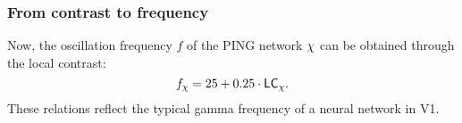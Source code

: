 \subsubsection{From contrast to frequency}

Now, the oscillation frequency $f$ of the PING network $\chi$ can be obtained through the local contrast:
\begin{equation}
    f_\chi = 25 + 0.25 \cdot \mathsf{LC}_\chi.
\end{equation}
These relations reflect the typical gamma frequency of a neural network in V1.